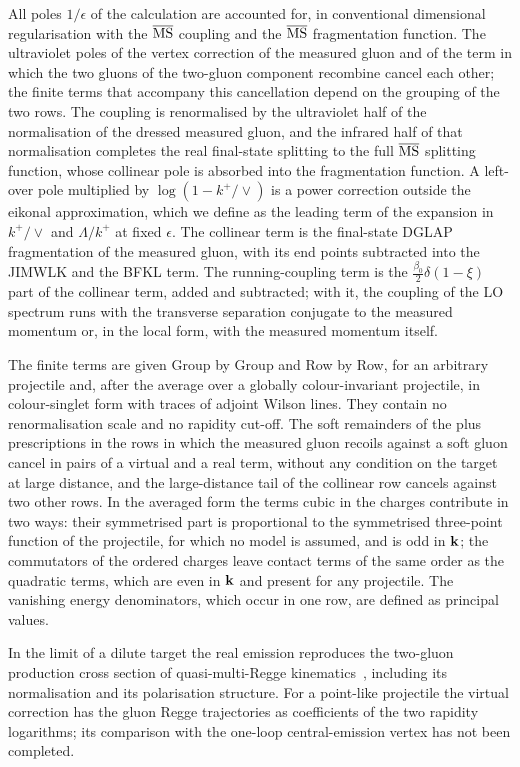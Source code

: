 All poles $1/\epsilon$ of the calculation are accounted for, in conventional dimensional regularisation with the $\overline{\rm MS}$ coupling and the $\overline{\rm MS}$ fragmentation function. The ultraviolet poles of the vertex correction of the measured gluon and of the term in which the two gluons of the two-gluon component recombine cancel each other; the finite terms that accompany this cancellation depend on the grouping of the two rows. The coupling is renormalised by the ultraviolet half of the normalisation of the dressed measured gluon, and the infrared half of that normalisation completes the real final-state splitting to the full $\overline{\rm MS}$ splitting function, whose collinear pole is absorbed into the fragmentation function. A left-over pole multiplied by $\log(1-k^+/\vee)$ is a power correction outside the eikonal approximation, which we define as the leading term of the expansion in $k^+/\vee$ and $\Lambda/k^+$ at fixed $\epsilon$. The collinear term is the final-state DGLAP fragmentation of the measured gluon, with its end points subtracted into the JIMWLK and the BFKL term. The running-coupling term is the $\frac{\beta_0}{2}\delta(1-\xi)$ part of the collinear term, added and subtracted; with it, the coupling of the LO spectrum runs with the transverse separation conjugate to the measured momentum or, in the local form, with the measured momentum itself.

The finite terms are given Group by Group and Row by Row, for an arbitrary projectile and, after the average over a globally colour-invariant projectile, in colour-singlet form with traces of adjoint Wilson lines. They contain no renormalisation scale and no rapidity cut-off. The soft remainders of the plus prescriptions in the rows in which the measured gluon recoils against a soft gluon cancel in pairs of a virtual and a real term, without any condition on the target at large distance, and the large-distance tail of the collinear row cancels against two other rows. In the averaged form the terms cubic in the charges contribute in two ways: their symmetrised part is proportional to the symmetrised three-point function of the projectile, for which no model is assumed, and is odd in $\mathbf{k}$; the commutators of the ordered charges leave contact terms of the same order as the quadratic terms, which are even in $\mathbf{k}$ and present for any projectile. The vanishing energy denominators, which occur in one row, are defined as principal values.

In the limit of a dilute target the real emission reproduces the two-gluon production cross section of quasi-multi-Regge kinematics~\cite{Fadin:1998py,Bartels:2006hg}, including its normalisation and its polarisation structure. For a point-like projectile the virtual correction has the gluon Regge trajectories as coefficients of the two rapidity logarithms; its comparison with the one-loop central-emission vertex has not been completed.

